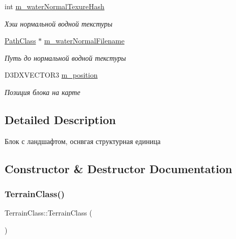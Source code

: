 \begin{DoxyCompactItemize}
int \hyperlink{class_terrain_class_a87931e597bff1aecb6571ad2f963af6e}{m\+\_\+water\+Normal\+Texure\+Hash}
\begin{DoxyCompactList}\small\item\em Хэш нормальной водной текстуры \end{DoxyCompactList}\item 
\hyperlink{class_path_class}{Path\+Class} $\ast$ \hyperlink{class_terrain_class_a66e673097e6804021e1c8bed1acbe9f4}{m\+\_\+water\+Normal\+Filename}
\begin{DoxyCompactList}\small\item\em Путь до нормальной водной текстуры \end{DoxyCompactList}\item 
D3\+D\+X\+V\+E\+C\+T\+O\+R3 \hyperlink{class_terrain_class_aaefbd0a09326be78e0f0819c1fa09ce3}{m\+\_\+position}
\begin{DoxyCompactList}\small\item\em Позиция блока на карте \end{DoxyCompactList}\end{DoxyCompactItemize}


\subsection{Detailed Description}
Блок с ландшафтом, оснвгая структурная единица 

\subsection{Constructor \& Destructor Documentation}
\mbox{\label{class_terrain_class_aae5b1ce1998dfb5242937d51dfca2809}} 
\subsubsection{\texorpdfstring{Terrain\+Class()}{TerrainClass()}\hspace{0.1cm}{\footnotesize\ttfamily [1/2]}}
{\footnotesize\ttfamily Terrain\+Class\+::\+Terrain\+Class (\begin{DoxyParamCaption}{ }\end{DoxyParamCaption})}

\mbox{\label{class_terrain_class_ac1fd7430fe016f3d678dd69b11102245}} 
